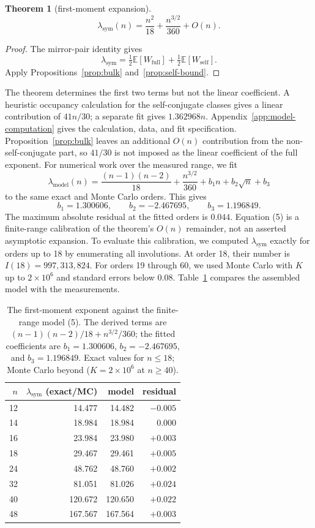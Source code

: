 \documentclass[11pt]{article}
\newtheorem{theorem}{Theorem}
\begin{document}
\begin{theorem}[first-moment expansion]
\label{thm:first-moment}
\[
\lambda_{\mathrm{sym}}(n)
=\frac{n^2}{18}+\frac{n^{3/2}}{360}+O(n).
\]
\end{theorem}

\begin{proof}
The mirror-pair identity gives
\[
\lambda_{\mathrm{sym}}
=\tfrac12\mathbb{E}[W_{\mathrm{full}}]
+\tfrac12\mathbb{E}[W_{\mathrm{self}}].
\]
Apply Propositions~\ref{prop:bulk} and~\ref{prop:self-bound}.
\end{proof}

The theorem determines the first two terms but not the linear
coefficient.  A heuristic occupancy calculation for the self-conjugate
classes gives a linear contribution of $41n/30$; a separate fit gives
$1.362968n$.  Appendix~\ref{app:model-computation} gives the calculation,
data, and fit specification.  Proposition~\ref{prop:bulk} leaves an
additional $O(n)$ contribution from the non-self-conjugate part, so
$41/30$ is not imposed as the linear coefficient of the full exponent.
For numerical work over the measured range, we fit
\[
\lambda_{\mathrm{model}}(n)
=\frac{(n-1)(n-2)}{18}+\frac{n^{3/2}}{360}
+b_1n+b_2\sqrt n+b_3
\tag{5}
\]
to the same exact and Monte Carlo orders.  This gives
\[
b_1=1.300606,\qquad b_2=-2.467695,\qquad b_3=1.196849.
\]
The maximum absolute residual at the fitted orders is $0.044$.  Equation
(5) is a finite-range calibration of the theorem's $O(n)$ remainder, not
an asserted asymptotic expansion.
To evaluate this calibration, we computed $\lambda_{\mathrm{sym}}$ exactly
for orders up to 18 by enumerating all involutions.  At order 18, their
number is $I(18)=997{,}313{,}824$.  For orders 19 through 60, we used Monte
Carlo with $K$ up to $2\times 10^{6}$ and standard errors below $0.08$.
Table~\ref{tab:lambda} compares the assembled model with the measurements.

\begin{table}[ht]
\centering
\begin{tabular}{rrrr}
\toprule
$n$ & $\lambda_{\mathrm{sym}}$ (exact/MC) & model & residual \\
\midrule
12 & 14.477 & 14.482 & $-0.005$ \\
14 & 18.984 & 18.984 & $0.000$ \\
16 & 23.984 & 23.980 & $+0.003$ \\
18 & 29.467 & 29.461 & $+0.005$ \\
24 & 48.762 & 48.760 & $+0.002$ \\
32 & 81.051 & 81.026 & $+0.024$ \\
40 & 120.672 & 120.650 & $+0.022$ \\
48 & 167.567 & 167.564 & $+0.003$ \\
\bottomrule
\end{tabular}
\caption{The first-moment exponent against the finite-range model (5).
The derived terms are $(n-1)(n-2)/18+n^{3/2}/360$; the fitted
coefficients are $b_1=1.300606$, $b_2=-2.467695$, and $b_3=1.196849$.
Exact values for $n\leq18$; Monte Carlo beyond
($K=2\times10^{6}$ at $n\geq40$).}
\label{tab:lambda}
\end{table}
\end{document}
